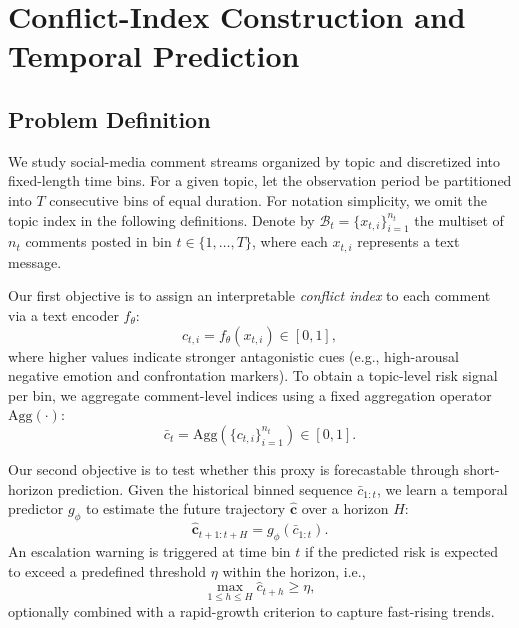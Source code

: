\documentclass[journal]{IEEEtran}
\begin{document}
\section{Conflict-Index Construction and Temporal Prediction}

\subsection{Problem Definition}

We study social-media comment streams organized by topic and discretized into fixed-length time bins. For a given topic, let the observation period be partitioned into $T$ consecutive bins of equal duration. For notation simplicity, we omit the topic index in the following definitions. Denote by $\mathcal{B}_t = \{x_{t,i}\}_{i=1}^{n_t}$ the multiset of $n_t$ comments posted in bin $t \in \{1, \dots, T\}$, where each $x_{t,i}$ represents a text message.

Our first objective is to assign an interpretable \emph{conflict index} to each comment via a text encoder $f_\theta$:
\begin{equation}
c_{t,i} = f_\theta(x_{t,i}) \in [0, 1],
\end{equation}
where higher values indicate stronger antagonistic cues (e.g., high-arousal negative emotion and confrontation markers). To obtain a topic-level risk signal per bin, we aggregate comment-level indices using a fixed aggregation operator $\mathrm{Agg}(\cdot)$:
\begin{equation}
\bar{c}_t = \mathrm{Agg}\left(\{c_{t,i}\}_{i=1}^{n_t}\right) \in [0, 1].
\end{equation}

Our second objective is to test whether this proxy is forecastable through short-horizon prediction. Given the historical binned sequence $\bar{c}_{1:t}$, we learn a temporal predictor $g_\phi$ to estimate the future trajectory $\mathbf{\hat{c}}$ over a horizon $H$:
\begin{equation}
\mathbf{\hat{c}}_{t+1:t+H} = g_\phi(\bar{c}_{1:t}).
\end{equation}
An escalation warning is triggered at time bin $t$ if the predicted risk is expected to exceed a predefined threshold $\eta$ within the horizon, i.e.,
\begin{equation}
\max_{1 \le h \le H} \hat{c}_{t+h} \ge \eta,
\end{equation}
optionally combined with a rapid-growth criterion to capture fast-rising trends.
\end{document}
